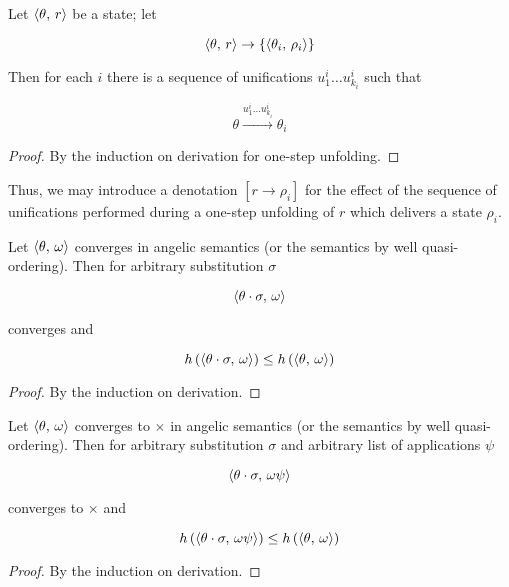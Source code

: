 \begin{lemma}
\label{lem:one-step-unfolding}

Let $\langle \theta,\,r \rangle$ be a state; let

\[
\langle \theta,\,r \rangle\to\{\langle \theta_i,\,\rho_i \rangle\}
\]

Then for each $i$ there is a sequence of unifications $u^i_1\dots u^i_{k_i}$ such that

\[
\theta\xrightarrow{u^i_1\dots u^i_{k_i}}{\theta_i}
\]
\end{lemma}
\begin{proof}
By the induction on derivation for one-step unfolding.
\end{proof}

Thus, we may introduce a denotation $[r\to\rho_i]$ for the effect of the sequence of unifications performed during a one-step unfolding of $r$ which
delivers a state $\rho_i$. 

\begin{lemma}[Weakening]
  \label{lem:weakening}

  Let $\langle \theta,\,\omega \rangle$ converges in angelic semantics (or the semantics by well quasi-ordering). Then for arbitrary substitution $\sigma$ 

  \[
  \langle \theta\cdot\sigma,\,\omega \rangle
  \]

  converges and

  \[
  h\,(\langle \theta\cdot\sigma,\,\omega \rangle)\le h\,(\langle \theta,\,\omega \rangle)
  \]
  
\end{lemma}
\begin{proof}
  By the induction on derivation.
\end{proof}

\begin{lemma}
  \label{lem:weakening-contradiciton}

  Let $\langle \theta,\,\omega \rangle$ converges to $\times$ in angelic semantics (or the semantics by well quasi-ordering). Then for arbitrary substitution $\sigma$ and
  arbitrary list of applications $\psi$

  \[
  \langle \theta\cdot\sigma,\,\omega\psi \rangle
  \]

  converges to $\times$ and

  \[
  h\,(\langle \theta\cdot\sigma,\,\omega\psi \rangle)\le h\,(\langle \theta,\,\omega \rangle)
  \]
  
\end{lemma}
\begin{proof}
  By the induction on derivation.
\end{proof}


